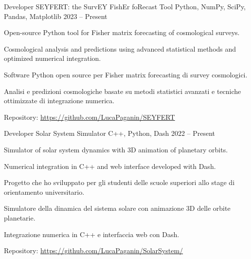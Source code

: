 


\begin{cventries}


\cventry
{Developer} %
{SEYFERT: the SurvEY FishEr foRecast Tool} %
{Python, NumPy, SciPy, Pandas, Matplotlib} %
{2023 -- Present} %
{ %
\begin{cvitems}
  \ifenglish
  \item {Open-source Python tool for Fisher matrix forecasting of cosmological surveys.}
  \item {Cosmological analysis and predictions using advanced statistical methods and optimized numerical integration.}
  \else
  \item {Software Python open source per Fisher matrix forecasting di survey cosmologici.}
  \item {Analisi e predizioni cosmologiche basate su metodi statistici avanzati e tecniche ottimizzate di integrazione numerica.}
  \fi
  \item {Repository: \url{https://github.com/LucaPaganin/SEYFERT}}
\end{cvitems}
}


\cventry
{Developer} %
{Solar System Simulator} %
{C++, Python, Dash} %
{2022 -- Present} %
{ %
\begin{cvitems}
    \ifenglish
    \item {Simulator of solar system dynamics with 3D animation of planetary orbits.}
    \item {Numerical integration in C++ and web interface developed with Dash.}
    \else
    \item {Progetto che ho sviluppato per gli studenti delle scuole superiori allo stage di orientamento universitario.}
    \item {Simulatore della dinamica del sistema solare con animazione 3D delle orbite planetarie.}
    \item {Integrazione numerica in C++ e interfaccia web con Dash.}
    \fi
    \item {Repository: \url{https://github.com/LucaPaganin/SolarSystem/}}  
\end{cvitems}
}


\end{cventries}
